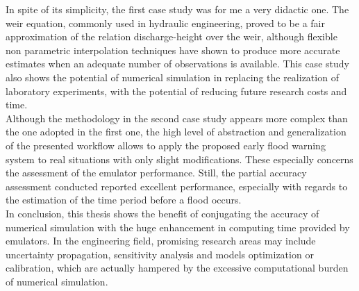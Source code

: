 In spite of its simplicity, the first case study was for me a very didactic one.
The weir equation, commonly used in hydraulic engineering, proved to be a fair approximation of the relation discharge-height over the weir, although flexible non parametric interpolation techniques have shown to produce more accurate estimates when an adequate number of observations is available.
This case study also shows the potential of numerical simulation in replacing the realization of laboratory experiments, with the potential of reducing future research costs and time.\\

Although the methodology in the second case study appears more complex than the one adopted in the first one, the high level of abstraction and generalization of the presented workflow allows to apply the proposed early flood warning system to real situations with only slight modifications. These especially concerns the assessment of the emulator performance. Still, the partial accuracy assessment conducted reported excellent performance, especially with regards to the estimation of the time period before a flood occurs. \\

In conclusion, this thesis shows the benefit of conjugating the accuracy of numerical simulation with the huge enhancement in computing time provided by emulators. In the engineering field, promising research areas may include uncertainty propagation, sensitivity analysis and models optimization or calibration, which are actually hampered by the excessive computational burden of numerical simulation. 


 

 
 

 


















